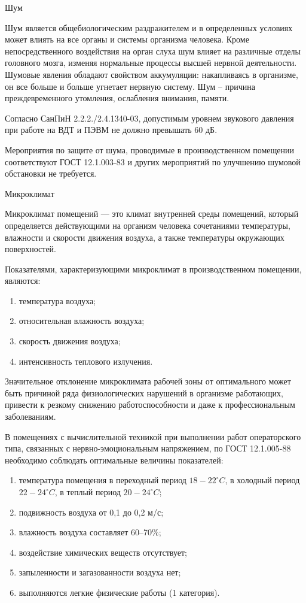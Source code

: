 \point Шум

Шум является общебиологическим раздражителем и в определенных условиях может влиять на все органы и системы организма человека.
Кроме непосредственного воздействия на орган слуха шум влияет на различные отделы головного мозга, изменяя нормальные процессы высшей нервной деятельности.
Шумовые явления обладают свойством аккумуляции: накапливаясь в организме, он все больше и больше угнетает нервную систему.
Шум -- причина преждевременного утомления, ослабления внимания, памяти.

Согласно СанПиН 2.2.2./2.4.1340-03, допустимым уровнем звукового давления при работе на ВДТ и ПЭВМ не должно превышать 60 дБ.

Мероприятия по защите от шума, проводимые в производственном помещении соответствуют ГОСТ 12.1.003-83 и других мероприятий по улучшению шумовой обстановки не требуется.

\point Микроклимат

Микроклимат помещений --- это климат внутренней среды помещений, который определяется действующими на организм человека сочетаниями температуры, влажности и скорости движения воздуха, а также температуры окружающих поверхностей.

Показателями, характеризующими микроклимат в производственном помещении, являются:

\begin{enumerate}
	\item температура воздуха;
	\item относительная влажность воздуха;
	\item скорость движения воздуха;
	\item интенсивность теплового излучения.
\end{enumerate}

Значительное отклонение микроклимата рабочей зоны от оптимального может быть причиной ряда физиологических нарушений в организме работающих, привести к резкому снижению работоспособности и даже к профессиональным заболеваниям.

В помещениях с вычислительной техникой при выполнении работ операторского типа, связанных с нервно-эмоциональным напряжением, по ГОСТ 12.1.005-88 необходимо соблюдать оптимальные величины показателей:

\begin{enumerate}
	\item температура помещения в переходный период $18-22^{\circ}C$, в холодный период $22-24^{\circ}C$, в теплый период $20-24^{\circ}C$;
	\item подвижность воздуха от 0,1 до 0,2 м/с;
	\item влажность воздуха составляет 60--70\%;
	\item воздействие химических веществ отсутствует;
	\item запыленности и загазованности воздуха нет;
	\item выполняются легкие физические работы (1 категория).
\end{enumerate}

